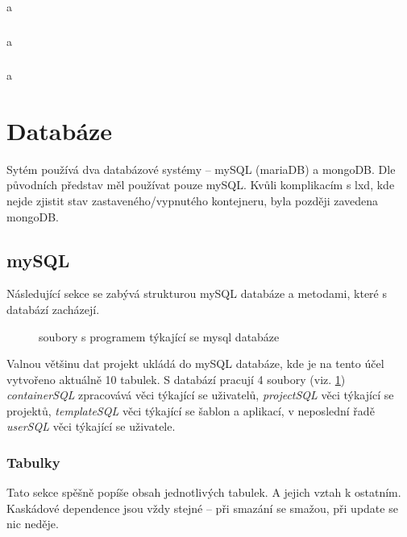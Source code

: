 \documentclass[a4paper,oneside,12pt]{report}
\begin{document}
a

\subsubsection{\color{apiblue}{GET -- /projects/user}}

a

\subsubsection{\color{apiblue}{GET -- /logout}}

a


\section{Databáze}

Sytém používá dva databázové systémy -- mySQL (mariaDB) a mongoDB.
Dle původních představ měl používat pouze mySQL.
Kvůli komplikacím s lxd, kde nejde zjistit stav zastaveného/vypnutého kontejneru, byla později zavedena mongoDB.

\subsection{mySQL}
Následující sekce se zabývá strukturou mySQL databáze a metodami, které s databází zacházejí.


\begin{figure}[h]
\caption{soubory s programem týkající se mysql databáze}
\label{fig:sqlClasses}
\end{figure}

Valnou většinu dat projekt ukládá do mySQL databáze, kde je na tento účel vytvořeno aktuálně 10 tabulek.
S databází pracují 4 soubory (viz. \ref{fig:sqlClasses}) \textit{containerSQL} zpracovává věci týkající se uživatelů, \textit{projectSQL} věci týkající se projektů, \textit{templateSQL} věci týkající se šablon a aplikací, v neposlední řadě \textit{userSQL} věci týkající se uživatele.

\subsubsection{Tabulky}

Tato sekce spěšně popíše obsah jednotlivých tabulek. A jejich vztah k ostatním. Kaskádové dependence jsou vždy stejné -- při smazání se smažou, při update se nic neděje.
\end{document}
